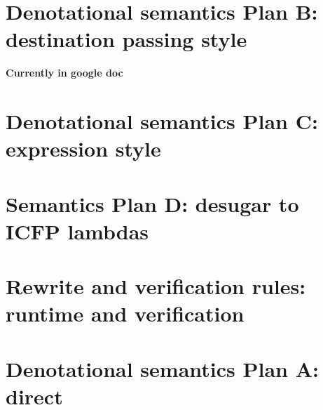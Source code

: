 \documentclass[acmsmall,screen,review]{acmart}\settopmatter{}
\begin{document}
\section{Denotational semantics Plan B: destination passing style}

{\bf Currently in google doc}


\section{Denotational semantics Plan C: expression style}





\section{Semantics Plan D: desugar to ICFP lambdas}




\section{Rewrite and verification rules: runtime and verification}




\section{Denotational semantics Plan A: direct}


\end{document}
